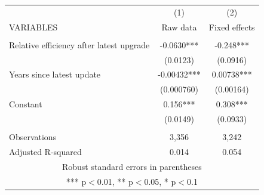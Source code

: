 \scriptsize
\begin{tabular}{lcc} \hline
 & (1) & (2) \\
VARIABLES & Raw data & Fixed effects \\ \hline
 &  &  \\
Relative efficiency after latest upgrade & -0.0630*** & -0.248*** \\
 & (0.0123) & (0.0916) \\
Years since latest update & -0.00432*** & 0.00738*** \\
 & (0.000760) & (0.00164) \\
Constant & 0.156*** & 0.308*** \\
 & (0.0149) & (0.0933) \\
 &  &  \\
Observations & 3,356 & 3,242 \\
 Adjusted R-squared & 0.014 & 0.054 \\ \hline
\multicolumn{3}{c}{ Robust standard errors in parentheses} \\
\multicolumn{3}{c}{ *** p$<$0.01, ** p$<$0.05, * p$<$0.1} \\
\end{tabular}
